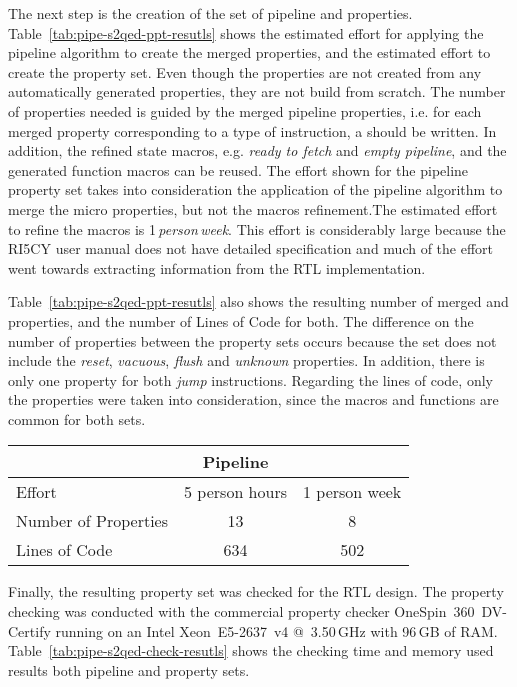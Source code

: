The next step is the creation of the set of pipeline and \SSQED{} properties. Table~\ref{tab:pipe-s2qed-ppt-resutls} shows the estimated effort for applying the pipeline algorithm to create the merged properties, and the estimated effort to create the \SSQED{} property set. Even though the \SSQED{} properties are not created from any automatically generated properties, they are not build from scratch. The number of properties needed is guided by the merged pipeline properties, i.e. for each merged property corresponding to a type of instruction, a \SSQED{} should be written. In addition, the refined state macros, e.g. \textit{ready to fetch} and \textit{empty pipeline}, and the generated function macros can be reused. The effort shown for the pipeline property set takes into consideration the application of the pipeline algorithm to merge the micro properties, but not the macros refinement.The estimated effort to refine the macros is 1\,\textit{person\,week}. This effort is considerably large because the RI5CY user manual \cite{manual-ri5cy} does not have detailed specification and much of the effort went towards extracting information from the RTL implementation.

Table~\ref{tab:pipe-s2qed-ppt-resutls} also shows the resulting number of merged and \SSQED{} properties, and the number of Lines of Code for both. The difference on the number of properties between the property sets occurs because the \SSQED{} set does not include the \textit{reset}, \textit{vacuous}, \textit{flush} and \textit{unknown} properties. In addition, there is only one \SSQED{} property for both \textit{jump} instructions. Regarding the lines of code, only the properties were taken into consideration, since the macros and functions are common for both sets.

\begin{table*}[htb!] 
	\centering 
	\caption{Results comparison between the Pipeline and \SSQED{} properties sets.} 
	\label{tab:pipe-s2qed-ppt-resutls}
	\begin{tabular}{p{5cm} c c} 
		  &  \textbf{Pipeline} & \textbf{\SSQED{}} \\     
		\hline	
		Effort  &  5 person hours & 1 person week \\
		Number of Properties  &  13 & 8 \\
		Lines of Code  &  634 & 502 \\
	\end{tabular} 
\end{table*}

Finally, the resulting property set was checked for the RTL design. The property checking was conducted with the commercial property checker OneSpin~360~DV-Certify \texttrademark{} running on an Intel Xeon~E5-2637~v4  @~3.50\,GHz with 96\,GB of RAM. Table~\ref{tab:pipe-s2qed-check-resutls} shows the checking time and memory used results both pipeline and \SSQED{} property sets.

